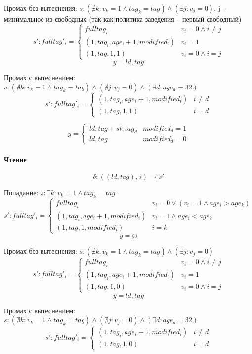 Промах без вытеснения: $s: (\nexists k : v_k = 1 \land tag_k = tag) \land (\exists j: v_j = 0)$, j -- минимальное из свободных (так как политика заведения -- первый свободный)
\[
s':fulltag'_i =
\begin{cases}
	fulltag_i & v_i = 0 \land i \neq j \\
	(1,tag_i,age_{i}+1,modified_i) & v_i = 1  \\
	(1,tag,1,1) & v_i = 0 \land i = j
\end{cases}
\]
$$y = ld,tag$$

Промах с вытеснением: $s: (\nexists k : v_k = 1 \land tag_k = tag) \land (\nexists j: v_j = 0) \land (\exists d: age_d = 32)$
\[
s':fulltag'_i =
\begin{cases}
	(1,tag_i,age_{i}+1,modified_i) & i \neq d \\
	(1,tag,1,1) & i = d
\end{cases}
\]

\[
y =
\begin{cases}
	ld,tag+st,tag_d & modified_d = 1 \\
	ld,tag & modified_d = 0
\end{cases}
\]

\paragraph*{Чтение}

$$\delta : ((ld,tag),s) \rightarrow s'$$

Попадание: $s: \exists k : v_k = 1 \land tag_k = tag$
\[
s':fulltag'_i =
\begin{cases}
	fulltag_i & v_i = 0 \lor (v_i = 1 \land age_i > age_k)\\
	(1,tag_i,age_{i}+1,modified_i) & v_i = 1 \land age_i < age_k \\
	(1,tag,1,modified_i) & i = k
\end{cases}
\]
$$y = \varnothing$$

Промах без вытеснения: $s: (\nexists k : v_k = 1 \land tag_k = tag) \land (\exists j: v_j = 0)$
\[
s':fulltag'_i =
\begin{cases}
	fulltag_i & v_i = 0 \land i \neq j \\
	(1,tag_i,age_{i}+1,modified_i) & v_i = 1 \\
	(1,tag,1,0) & v_i = 0 \land i = j
\end{cases}
\]
$$y = ld,tag$$

Промах с вытеснением: $s: (\nexists k : v_k = 1 \land tag_k = tag) \land (\nexists j: v_j = 0) \land (\exists d: age_d = 32)$
\[
s':fulltag'_i =
\begin{cases}
	(1,tag_i,age_{i}+1,modified_i) & i \neq d \\
	(1,tag,1,0) & i = d
\end{cases}
\]

